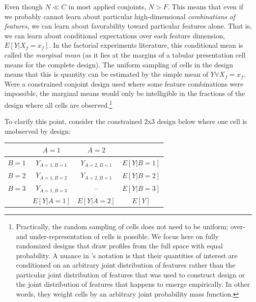\documentclass[a4paper,12pt]{article}\usepackage[]{graphicx}\usepackage[]{color}
\begin{document}
Even though $N \ll C$ in most applied conjoints, $N > F$. This means that even if we probably cannot learn about particular high-dimensional \textit{combinations of features}, we can learn about favorability toward particular features alone. That is, we can learn about conditional expectations over each feature dimension, $E[Y|X_f=x_f]$. In the factorial experiments literature, this conditional mean is called the \textit{marginal mean} (as it lies at the margins of a tabular presentation cell means for the complete design). The uniform sampling of cells in the design means that this is quantity can be estimated by the simple mean of $Y \forall X_f = x_f$. Were a constrained conjoint design used where some feature combinations were impossible, the marginal means would only be intelligible in the fractions of the design where all cells are observed.\footnote{Practically, the random sampling of cells does not need to be uniform; over- and under-representation of cells is possible. We focus here on fully randomized designs that draw profiles from the full space with equal probability. A nuance in \citeauthor{HainmuellerHopkinsYamamoto2014}'s notation is that their quantities of interest are conditioned on an arbitrary joint distribution of features rather than the particular joint distribution of features that was used to construct design or the joint distribution of features that happens to emerge empirically. In other words, they weight cells by an arbitrary joint probability mass function.}

To clarify this point, consider the constrained 2x3 design below where one cell is unobserved by design:

\begin{center}
\begin{tabular}{lccc}\toprule
 & $A = 1$ & $A = 2$ & \\ \midrule
$B = 1$ & $Y_{A=1, B=1}$ & $Y_{A=2, B=1}$ & $E[Y|B=1]$ \\
$B = 2$ & $Y_{A=1, B=2}$ & $Y_{A=2, B=1}$ & $E[Y|B=2]$ \\
$B = 3$ & $Y_{A=1, B=3}$ & -- & $E[Y|B=3]$ \\ \midrule
 & $E[Y|A=1]$ & $E[Y|A=2]$ & $E[Y]$ \\ \bottomrule
\end{tabular}
\end{center}
\end{document}
